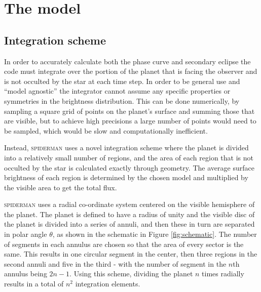 \documentclass[a4paper,fleqn,usenatbib]{mnras}
\begin{document}
\section{The model}\label{sec:the model}

\subsection{Integration scheme}\label{sec:integrator}

In order to accurately calculate both the phase curve and secondary eclipse the code must integrate over the portion of the planet that is facing the observer and is not occulted by the star at each time step. In order to be general use and ``model agnostic'' the integrator cannot assume any specific properties or symmetries in the brightness distribution. This can be done numerically, by sampling a square grid of points on the planet's surface and summing those that are visible, but to achieve high precisions a large number of points would need to be sampled, which would be slow and computationally inefficient.

Instead, \textsc{spiderman} uses a novel integration scheme where the planet is divided into a relatively small number of regions, and the area of each region that is not occulted by the star is calculated exactly through geometry. The average surface brightness of each region is determined by the chosen model and multiplied by the visible area to get the total flux.

\textsc{spiderman} uses a radial co-ordinate system centered on the visible hemisphere of the planet. The planet is defined to have a radius of unity and the visible disc of the planet is divided into a series of annuli, and then these in turn are separated in polar angle $\theta$, as shown in the schematic in Figure \ref{fig:schematic}. The number of segments in each annulus are chosen so that the area of every sector is the same. This results in one circular segment in the center, then three regions in the second annuli and five in the third - with the number of segment in the $n$th annulus being $2n - 1$. Using this scheme, dividing the planet $n$ times radially results in a total of $n^2$ integration elements.
\end{document}
